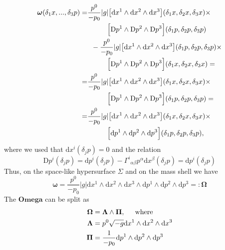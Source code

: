 \begin{equation}
\begin{aligned}
\boldsymbol{\omega}(\delta_1 x,...,\delta_3 p) =& \frac{p^0}{-p_0}|g|\big[\text{d}x^1\wedge\text{d}x^2\wedge\text{d}x^3\big](\delta_{1}x,\delta_{2}x,\delta_{3}x)\times \\
& \hspace{10mm} \Big[\text{D}p^1\wedge\text{D}p^2\wedge\text{D}p^3\Big](\delta_1 p, \delta_2 p, \delta_3 p) \\
& \hspace{2mm} -\frac{p^0}{-p_0}|g|\big[\text{d}x^1\wedge\text{d}x^2\wedge\text{d}x^3\big](\delta_{1}p,\delta_{2}p,\delta_{3}p)\times \\
& \hspace{10mm} \Big[\text{D}p^1\wedge\text{D}p^2\wedge\text{D}p^3\Big](\delta_1 x, \delta_2 x, \delta_3 x) = \\
=& \frac{p^0}{-p_0}|g|\big[\text{d}x^1\wedge\text{d}x^2\wedge\text{d}x^3\big](\delta_{1}x,\delta_{2}x,\delta_{3}x)\times \\
& \hspace{10mm} \Big[\text{D}p^1\wedge\text{D}p^2\wedge\text{D}p^3\Big](\delta_1 p, \delta_2 p, \delta_3 p) = \\
=& \frac{p^0}{-p_0}|g|\big[\text{d}x^1\wedge\text{d}x^2\wedge\text{d}x^3\big](\delta_{1}x,\delta_{2}x,\delta_{3}x)\times \\
& \hspace{10mm} \Big[\text{d}p^1\wedge\text{d}p^2\wedge\text{d}p^3\Big](\delta_1 p, \delta_2 p, \delta_3 p), \\
\end{aligned}
\end{equation}
%
where we used that $\text{d}x^i(\delta_j p)=0$ and the relation
%
\begin{equation}
\text{D}p^{i}(\delta_j p) = \text{d}p^{i}(\delta_j p) - {\Gamma^i}_{\alpha\beta}p^{\alpha}\text{d}x^{\beta}(\delta_j p) = \text{d}p^i(\delta_j p)
\end{equation}
%
Thus, on the space-like hypersurface $\Sigma$ and on the mass shell we have
%
\begin{equation}
\boldsymbol{\omega} = \frac{p^0}{-p_0}|g|\text{d}x^1\wedge\text{d}x^2\wedge\text{d}x^3\wedge\text{d}p^1\wedge\text{d}p^2\wedge\text{d}p^3 =: \boldsymbol{\Omega}
\end{equation}
%
The $\boldsymbol{Omega}$ can be split as 
%
\begin{equation}
\begin{aligned}
\boldsymbol{\Omega} &= \boldsymbol{\Lambda} \wedge \boldsymbol{\Pi}, \hspace{5mm} \text{where} \\
\boldsymbol{\Lambda} &= p^0 \sqrt{-g}\text{d}x^1\wedge\text{d}x^2\wedge\text{d}x^3 \\
\boldsymbol{\Pi} &=  \frac{1}{-p_0}\text{d}p^1\wedge\text{d}p^2\wedge\text{d}p^3
\end{aligned}
\end{equation}
